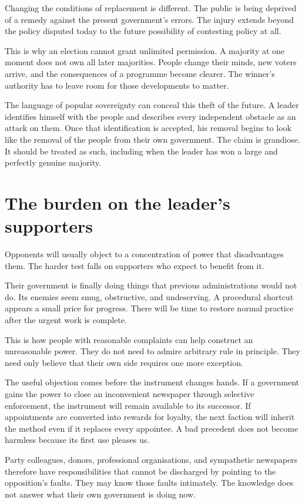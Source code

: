 \documentclass[12pt,a4paper]{book}
\begin{document}
Changing the conditions of replacement is different. The public is being deprived of a remedy against the present government's errors. The injury extends beyond the policy disputed today to the future possibility of contesting policy at all.

This is why an election cannot grant unlimited permission. A majority at one moment does not own all later majorities. People change their minds, new voters arrive, and the consequences of a programme become clearer. The winner's authority has to leave room for those developments to matter.

The language of popular sovereignty can conceal this theft of the future. A leader identifies himself with the people and describes every independent obstacle as an attack on them. Once that identification is accepted, his removal begins to look like the removal of the people from their own government. The claim is grandiose. It should be treated as such, including when the leader has won a large and perfectly genuine majority.

\section*{The burden on the leader's supporters}

Opponents will usually object to a concentration of power that disadvantages them. The harder test falls on supporters who expect to benefit from it.

Their government is finally doing things that previous administrations would not do. Its enemies seem smug, obstructive, and undeserving. A procedural shortcut appears a small price for progress. There will be time to restore normal practice after the urgent work is complete.

This is how people with reasonable complaints can help construct an unreasonable power. They do not need to admire arbitrary rule in principle. They need only believe that their own side requires one more exception.

The useful objection comes before the instrument changes hands. If a government gains the power to close an inconvenient newspaper through selective enforcement, the instrument will remain available to its successor. If appointments are converted into rewards for loyalty, the next faction will inherit the method even if it replaces every appointee. A bad precedent does not become harmless because its first use pleases us.

Party colleagues, donors, professional organisations, and sympathetic newspapers therefore have responsibilities that cannot be discharged by pointing to the opposition's faults. They may know those faults intimately. The knowledge does not answer what their own government is doing now.
\end{document}
